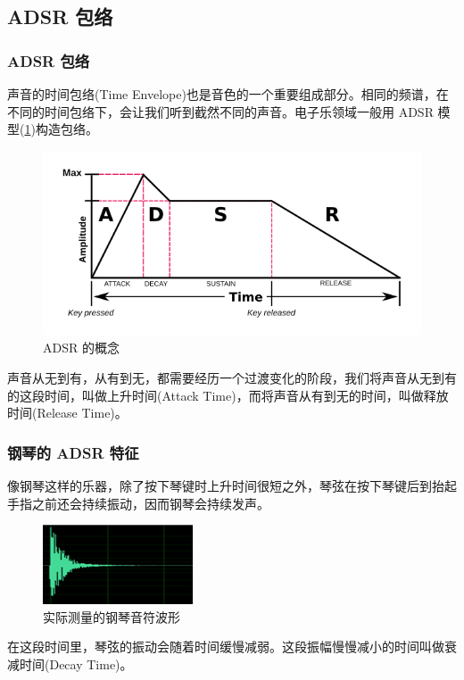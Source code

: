 \documentclass[utf8,10pt]{beamer}
\begin{document}
\subsection{ADSR 包络}
\begin{frame}
    \frametitle{ADSR 包络}

    声音的时间包络(Time Envelope)也是音色的一个重要组成部分。相同的频谱，在不同的时间包络下，会让我们听到截然不同的声音。电子乐领域一般用 ADSR 模型(\ref{fig:adsr_concept})构造包络。

    \begin{figure}[htpb]
        \centering
        \includegraphics[height=0.4\textheight]{figures/adsr_concep.png}
        \caption{ADSR 的概念}
        \label{fig:adsr_concept}
    \end{figure}

    声音从无到有，从有到无，都需要经历一个过渡变化的阶段，我们将声音从无到有的这段时间，叫做上升时间(Attack Time)，而将声音从有到无的时间，叫做释放时间(Release Time)。

\end{frame}

\begin{frame}
    \frametitle{钢琴的 ADSR 特征}

    像钢琴这样的乐器，除了按下琴键时上升时间很短之外，琴弦在按下琴键后到抬起手指之前还会持续振动，因而钢琴会持续发声。

    \begin{figure}[htpb]
        \centering
        \includegraphics[height=0.4\textheight]{figures/adsr_real_piano.png}
        \caption{实际测量的钢琴音符波形}
        \label{fig:real_piano_adsr}
    \end{figure}

    在这段时间里，琴弦的振动会随着时间缓慢减弱。这段振幅慢慢减小的时间叫做衰减时间(Decay Time)。

\end{frame}
\end{document}
